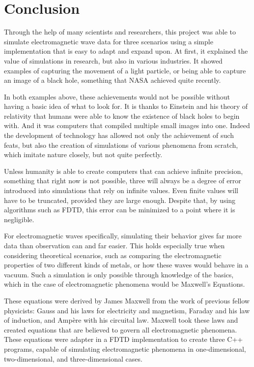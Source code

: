 
\chapter{Conclusion} %

\label{Chapter5} %

Through the help of many scientists and researchers, this project was able to simulate electromagnetic wave data for three scenarios using a simple implementation that is easy to adapt and expand upon. At first, it explained the value of simulations in research, but also in various industries. It showed examples of capturing the movement of a light particle\textsuperscript{\cite{velten2013femto}}, or being able to capture an image of a black hole\textsuperscript{\cite{landau_2019}}, something that NASA achieved quite recently.

In both examples above, these achievements would not be possible without having a basic idea of what to look for. It is thanks to Einstein and his theory of relativity that humans were able to know the existence of black holes to begin with\textsuperscript{\cite{Eling_2010}}. And it was computers that compiled multiple small images into one. Indeed the development of technology has allowed not only the achievement of such feats, but also the creation of simulations of various phenomena from scratch, which imitate nature closely, but not quite perfectly.

Unless humanity is able to create computers that can achieve infinite precision, something that right now is not possible, three will always be a degree of error introduced into simulations that rely on infinite values. Even finite values will have to be truncated, provided they are large enough. Despite that, by using algorithms such as FDTD, this error can be minimized to a point where it is negligible. 

For electromagnetic waves specifically, simulating their behavior gives far more data than observation can and far easier. This holds especially true when considering theoretical scenarios, such as comparing the electromagnetic properties of two different kinds of metals, or how these waves would behave in a vacuum. Such a simulation is only possible through knowledge of the basics, which in the case of electromagnetic phenomena would be Maxwell's Equations.

These equations were derived by James Maxwell from the work of previous fellow physicists: Gauss and his laws for electricity and magnetism, Faraday and his law of induction, and Ampère with his circuital law. Maxwell took these laws and created equations that are believed to govern all electromagnetic phenomena. These equations  were adapter in a FDTD implementation to create three C++ programs, capable of simulating electromagnetic phenomena in one-dimensional, two-dimensional, and three-dimensional cases.

